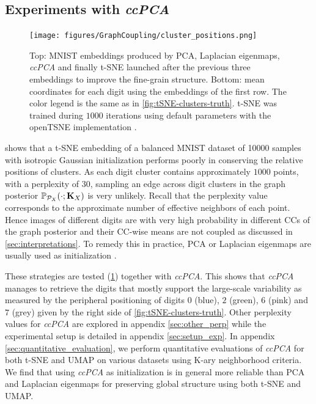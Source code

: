 \subsection{Experiments with \textit{ccPCA}}\label{sec:ccPCA}

\begin{figure}[t]
\begin{center}
\centerline{\texttt{[image: figures/GraphCoupling/cluster\_positions.png]}}
\caption{Top: MNIST embeddings produced by PCA, Laplacian eigenmaps, \textit{ccPCA} and finally t-SNE launched after the previous three embeddings to improve the fine-grain structure. Bottom: mean coordinates for each digit using the embeddings of the first row. The color legend is the same as in \cref{fig:tSNE-clusters-truth}. t-SNE was trained during $1000$ iterations using default parameters with the openTSNE implementation \cite{polivcar2019opentsne}.}
\label{fig:methods_embeddings}
\end{center}
\vspace{-0.8cm}
\end{figure}

 shows that a t-SNE embedding of a balanced MNIST dataset of 10000 samples \cite{deng2012mnist} with isotropic Gaussian initialization performs poorly in conserving the relative positions of clusters. As each digit cluster contains approximately $1000$ points, with a perplexity of $30$, sampling an edge across digit clusters in the graph posterior $\mathbb{P}_{\mathcal{P}_X}(\cdot;\mathbf{K}_{X})$ is very unlikely. Recall that the perplexity value \cite{maaten2008tSNE} corresponds to the approximate number of effective neighbors of each point. Hence images of different digits are with very high probability in different CCs of the graph posterior and their CC-wise means are not coupled as discussed in \cref{sec:interpretations}. To remedy this in practice, PCA or Laplacian eigenmaps are usually used as initialization \cite{kobak2021initialization}. 

These strategies are tested (\cref{fig:methods_embeddings}) together with \textit{ccPCA}. This shows that 
\textit{ccPCA} manages to retrieve the digits that mostly support the large-scale variability as measured by the peripheral positioning of digits $0$ (blue), $2$ (green), $6$ (pink) and $7$ (grey) given by the right side of \cref{fig:tSNE-clusters-truth}. Other perplexity values for \textit{ccPCA} are explored in appendix \ref{sec:other_perp} while the experimental setup is detailed in appendix \ref{sec:setup_exp}. In appendix \ref{sec:quantitative_evaluation}, we perform quantitative evaluations of \textit{ccPCA} for both t-SNE and UMAP on various datasets using K-ary neighborhood criteria. We find that using \textit{ccPCA} as initialization is in general more reliable than PCA and Laplacian eigenmaps for preserving global structure using both t-SNE and UMAP. 


